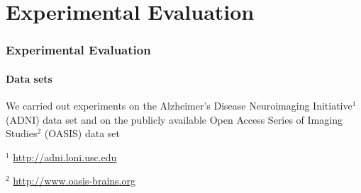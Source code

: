 \section{Experimental Evaluation}

\begin{frame}
	\frametitle{Experimental Evaluation}
	\framesubtitle{Data sets}
	
	\Large
	
	\vspace{0.5cm}
	
	We carried out experiments on the Alzheimer's Disease Neuroimaging Initiative$^1$  (ADNI) data set
	and on the publicly available Open Access Series of Imaging Studies$^2$ (OASIS) data set
	
	\begin{center}
	\end{center}
	
	\vspace{-0.05cm}
	
	\tiny
	
	$^1$ \url{http://adni.loni.usc.edu}
	
	$^2$ \url{http://www.oasis-brains.org}
\end{frame}


